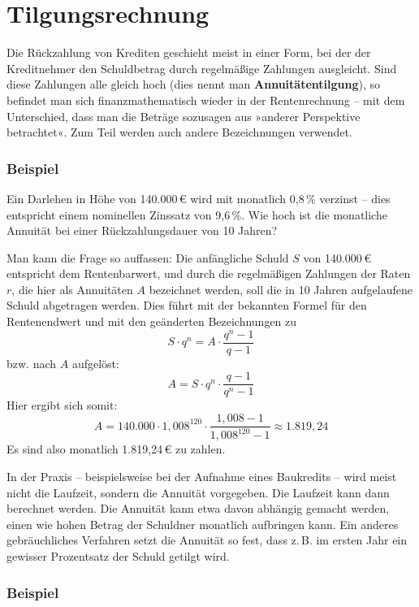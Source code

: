 \section{Tilgungsrechnung}


Die Rückzahlung von Krediten geschieht meist in einer Form, bei der der Kreditnehmer den Schuldbetrag durch regelmäßige Zahlungen ausgleicht. Sind diese Zahlungen alle gleich hoch (dies nennt man \textbf{Annuitätentilgung}), so befindet man sich finanzmathematisch wieder in der Rentenrechnung -- mit dem Unterschied, dass man die Beträge sozusagen aus »anderer Perspektive betrachtet«. Zum Teil werden auch andere Bezeichnungen verwendet.

\subsubsection{Beispiel}

Ein Darlehen in Höhe von 140.000\,€ wird mit monatlich 0{,}8\,\% verzinst -- dies entspricht einem nominellen Zinssatz von 9{,}6\,\%. Wie hoch ist die monatliche Annuität bei einer Rückzahlungsdauer von 10 Jahren?

Man kann die Frage so auffassen: Die anfängliche Schuld $S$ von 140.000\,€ entspricht dem Rentenbarwert, und durch die regelmäßigen Zahlungen der Raten $r$, die hier als Annuitäten $A$ bezeichnet werden, soll die in 10 Jahren aufgelaufene Schuld abgetragen werden. Dies führt mit der bekannten Formel für den Rentenendwert und mit den geänderten Bezeichnungen zu
\[ S \cdot q^n = A \cdot \frac{q^n - 1}{q - 1} \]
bzw. nach $A$ aufgelöst:
\[ A = S \cdot q^n \cdot \frac{q - 1}{q^n - 1} \]
Hier ergibt sich somit:
\[ A = 140.000 \cdot 1{,}008^{120} \cdot \frac{1{,}008 - 1}{1{,}008^{120} - 1} \approx 1.819{,}24 \]
Es sind also monatlich 1.819{,}24\,€ zu zahlen.\beispielende

In der Praxis -- beispielsweise bei der Aufnahme eines Baukredits -- wird meist nicht die Laufzeit, sondern die Annuität vorgegeben. Die Laufzeit kann dann berechnet werden. Die Annuität kann etwa davon abhängig gemacht werden, einen wie hohen Betrag der Schuldner monatlich aufbringen kann. Ein anderes gebräuchliches Verfahren setzt die Annuität so fest, dass z.\,B. im ersten Jahr ein gewisser Prozentsatz der Schuld getilgt wird.

\subsubsection{Beispiel}


